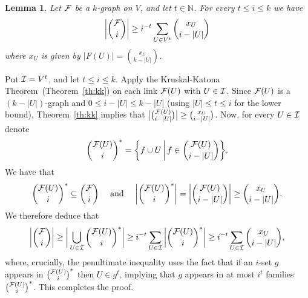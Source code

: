 \documentclass[11pt]{article}
\makeatletter
\renewenvironment{proof}[1][\proofname]
{\par\pushQED{\qed}
	\normalfont\topsep6\p@\@plus6\p@\relax\trivlist
	\item[\hskip\labelsep\bfseries#1\@addpunct{.}]
	\ignorespaces}
{\popQED\endtrivlist\@endpefalse}
\newtheorem{lemma}[theo]{Lemma}
\newcommand{\FF}{{\cal F}}
\newcommand{\sub}{\subseteq}
\newcommand{\N}{\mathbb{N}}
\makeatother
\begin{document}
\begin{lemma}\label{lemma:neat}
	Let $\FF$ be a $k$-graph on $V$, and let $t \in \N$.
	For every $t \le i \le k$ we have
	$$\bigg|\binom{\FF}{i}\bigg| \ge i^{-t} \sum_{U \in V^t} \binom{x_U}{i-|U|} $$
	where $x_U$ is given by $|F(U)| = \binom{x_U}{k-|U|}$.
\end{lemma}
\begin{proof}
	Put $\mathcal{I}=V^t$, and let $t \le i \le k$.
	Apply the Kruskal-Katona Theorem~(Theorem~\ref{th:kk}) on each link $\FF(U)$ with $U \in \mathcal{I}$. Since $\FF(U)$ is a $(k-|U|)$-graph and $0 \le i-|U|  \le k-|U|$ (using $|U|\le t \le i$ for the lower bound), Theorem~\ref{th:kk} implies that $\big|\binom{\FF(U)}{i-|U|}\big| \ge \binom{x_U}{i-|U|}$.
	Now, for every $U \in \mathcal{I}$ denote 
	$$\binom{\FF(U)}{i}^* = \bigg\{ f \cup U \,\bigg\vert\, f \in \binom{\FF(U)}{i-|U|} \bigg\}.$$ 
	We have that
	$$\binom{\FF(U)}{i}^* \sub \binom{\FF}{i} \quad\text{ and }\quad \bigg|\binom{\FF(U)}{i}^*\bigg| = \bigg|\binom{\FF(U)}{i-|U|}\bigg| \ge \binom{x_U}{i-|U|}.$$
	We therefore deduce that
	$$\bigg|\binom{\FF}{i}\bigg| \ge \bigg|\bigcup_{U \in \II} \binom{\FF(U)}{i}^*\bigg| \ge i^{-t}\sum_{U \in \II} \bigg|\binom{\FF(U)}{i}^*\bigg| \ge i^{-t}\sum_{U \in \II} \binom{x_U}{i-|U|} ,$$
	where, crucially, the penultimate inequality uses the fact that if an $i$-set $g$ appears in $\binom{\FF(U)}{i}^*$ then 
	$U \in g^t$, 
	implying that $g$ appears in at most $i^t$ families $\binom{\FF(U)}{i}^*$.
	This completes the proof.
\end{proof}
\end{document}
